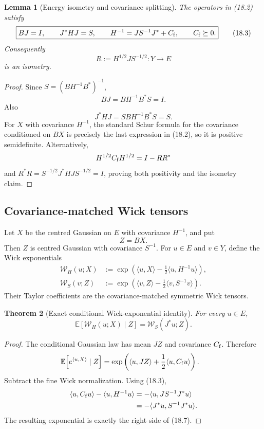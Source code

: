 \documentclass[11pt,oneside]{book}
\newtheorem{theorem}{Theorem}[chapter]
\newtheorem{lemma}[theorem]{Lemma}
\theoremstyle{definition}
\theoremstyle{remark}
\begin{document}
\begin{lemma}[Energy isometry and covariance splitting]
\label{lem:e8v18-isometry}
The operators in (18.2) satisfy
\[
\boxed{
 BJ=I,\qquad J^*HJ=S,\qquad
 H^{-1}=JS^{-1}J^*+C_{\rm f},\qquad C_{\rm f}\succeq0.}             \tag{18.3}
\]
Consequently
\[
                   R:=H^{1/2}JS^{-1/2}:Y\to E                     \tag{18.4}
\]
is an isometry.
\end{lemma}

\begin{proof}
Since \(S=(BH^{-1}B^*)^{-1}\),
\[
 BJ=BH^{-1}B^*S=I.
\]
Also
\[
 J^*HJ
 =SBH^{-1}B^*S=S.
\]
For \(X\) with covariance \(H^{-1}\), the standard Schur formula for
the covariance conditioned on \(BX\) is precisely the last expression
in (18.2), so it is positive semidefinite.  Alternatively,
\[
 H^{1/2}C_{\rm f}H^{1/2}
 =I-RR^*
\]
and \(R^*R=S^{-1/2}J^*HJS^{-1/2}=I\), proving both positivity and the
isometry claim.
\end{proof}

\subsection{Covariance-matched Wick tensors}

Let \(X\) be the centred Gaussian on \(E\) with covariance \(H^{-1}\),
and put
\[
                              Z=BX.                                \tag{18.5}
\]
Then \(Z\) is centred Gaussian with covariance \(S^{-1}\).
For \(u\in E\) and \(v\in Y\), define the Wick exponentials
\[
\begin{split}
\mathcal W_H(u;X)
 &:=\exp\left(\langle u,X\rangle
       -\frac12\langle u,H^{-1}u\rangle\right),\\
\mathcal W_S(v;Z)
 &:=\exp\left(\langle v,Z\rangle
       -\frac12\langle v,S^{-1}v\rangle\right).                    \tag{18.6}
\end{split}
\]
Their Taylor coefficients are the covariance-matched symmetric Wick
tensors.

\begin{theorem}[Exact conditional Wick-exponential identity]
\label{thm:e8v18-wick-exponential}
For every \(u\in E\),
\[
\boxed{\qquad
\mathbb E\!\left[\mathcal W_H(u;X)\mid Z\right]
       =\mathcal W_S(J^*u;Z).
\qquad}                                                           \tag{18.7}
\]
\end{theorem}

\begin{proof}
The conditional Gaussian law has mean \(JZ\) and covariance
\(C_{\rm f}\).  Therefore
\[
\begin{split}
\mathbb E\!\left[e^{\langle u,X\rangle}\mid Z\right]
 &=\exp\left(\langle u,JZ\rangle
       +\frac12\langle u,C_{\rm f}u\rangle\right).
\end{split}
\]
Subtract the fine Wick normalization.  Using (18.3),
\[
\begin{split}
\langle u,C_{\rm f}u\rangle-\langle u,H^{-1}u\rangle
 &=-\langle u,JS^{-1}J^*u\rangle\\
 &=-\langle J^*u,S^{-1}J^*u\rangle.
\end{split}
\]
The resulting exponential is exactly the right side of (18.7).
\end{proof}
\end{document}
